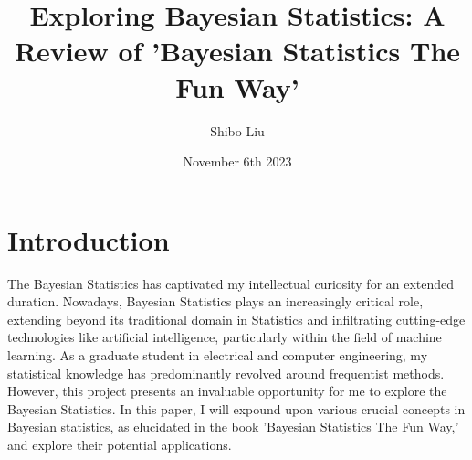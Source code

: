 \documentclass{article}
\title{Exploring Bayesian Statistics: A Review of 'Bayesian Statistics The Fun Way'}
\author{Shibo Liu}
\date{November 6th 2023}
\begin{document}
\maketitle

\section{Introduction}
The Bayesian Statistics has captivated my intellectual curiosity for an extended duration. Nowadays, Bayesian Statistics plays an increasingly critical role, extending beyond its traditional domain in Statistics and infiltrating cutting-edge technologies like artificial intelligence, particularly within the field of machine learning. As a graduate student in electrical and computer engineering, my statistical knowledge has predominantly revolved around frequentist methods. However, this project presents an invaluable opportunity for me to explore the Bayesian Statistics. In this paper, I will expound upon various crucial concepts in Bayesian statistics, as elucidated in the book 'Bayesian Statistics The Fun Way,' and explore their potential applications.
\end{document}
